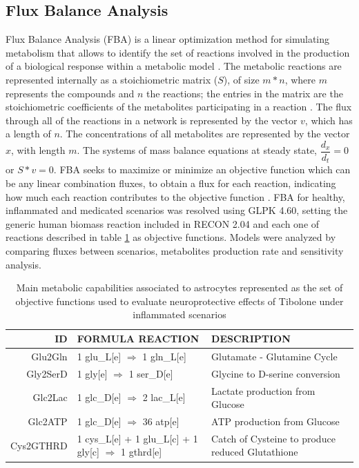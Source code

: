 \subsection*{Flux Balance Analysis}
Flux Balance Analysis (FBA) is a linear optimization method for simulating metabolism that allows to identify the set of reactions involved in the production of a biological response within a metabolic model \cite{Orth2010}. The metabolic reactions are represented internally as a stoichiometric matrix ($S$), of size $m * n$, where $m$ represents the compounds and $n$ the reactions; the entries in the matrix are the stoichiometric coefficients of the metabolites participating in a reaction \cite{Raman2009}. The flux through all of the reactions in a network is represented by the vector $v$, which has a length of $n$. The concentrations of all metabolites are represented by the vector $x$, with length $m$. The systems of mass balance equations at steady state, $\dfrac{d_{x}}{d_{t}}=0$ or $S * v = 0$. FBA seeks to maximize or minimize an objective function which can be any linear combination fluxes, to obtain a flux for each reaction, indicating how much each reaction contributes to the objective function \cite{Orth2010}. FBA for healthy, inflammated and medicated scenarios was resolved using GLPK 4.60, setting the generic human biomass reaction included in RECON 2.04 and each one of reactions described in table \ref{OF} as objective functions. Models were analyzed by comparing fluxes between scenarios, metabolites production rate and sensitivity analysis.

\begin{table}[h]
\caption{Main metabolic capabilities associated to astrocytes represented as the set of objective functions used to evaluate neuroprotective effects of Tibolone under inflammated scenarios}
\label{OF}
\begin{center}
\begin{tabular}{rm{6.5cm}m{6cm}}
\hline
ID & FORMULA REACTION & DESCRIPTION \\
\hline
\hline
Glu2Gln & 1 glu\_L[e] $\Rightarrow$ 1 gln\_L[e] & Glutamate - Glutamine Cycle \\
Gly2SerD & 1 gly[e] $\Rightarrow$ 1 ser\_D[e] & Glycine to D-serine conversion\\
Glc2Lac & 1 glc\_D[e] $\Rightarrow$ 2 lac\_L[e]& Lactate production from Glucose \\
Glc2ATP & 1 glc\_D[e] $\Rightarrow$ 36 atp[e] & ATP production from Glucose \\
Cys2GTHRD&1 cys\_L[e] + 1 glu\_L[c] + 1 gly[c] $\Rightarrow$ 1 gthrd[e]& Catch of Cysteine to produce reduced Glutathione \\
\hline
\end{tabular}
\end{center}
\end{table} 
